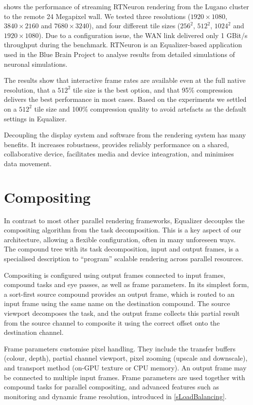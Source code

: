  shows the performance of streaming RTNeuron rendering from the
Lugano cluster to the remote 24 Megapixel wall. We tested three resolutions
($1920\times 1080$, $3840\times 2160$ and $7680\times 3240$), and four
different tile sizes ($256^2$, $512^2$, $1024^2$ and $1920\times 1080$). Due to
a configuration issue, the WAN link delivered only 1 GBit/s throughput during
the benchmark. RTNeuron is an Equalizer-based application used in the Blue
Brain Project to analyse results from detailed simulations of neuronal
simulations.

The results show that interactive frame rates are available even at the full
native resolution, that a $512^2$ tile size is the best option, and that 95\%
compression delivers the best performance in most cases. Based on the
experiments we settled on a $512^2$ tile size and 100\% compression quality to
avoid artefacts as the default settings in Equalizer.

Decoupling the display system and software from the rendering system has many
benefits. It increases robustness, provides reliably performance on a shared,
collaborative device, facilitates media and device inteagration, and minimises
data movement.

\section{Compositing}

In contrast to most other parallel rendering frameworks, Equalizer decouples the
compositing algorithm from the task decomposition. This is a key aspect of our
architecture, allowing a flexible configuration, often in many unforeseen
ways. The compound tree with its task decomposition, input and output frames, is
a specialised description to ``program''  scalable rendering across parallel
resources.

Compositing is configured using output frames connected to input frames,
compound tasks and eye passes, as well as frame parameters. In its simplest
form, a sort-first source compound provides an output frame, which is routed
to an input frame using the same name on the destination compound. The source
viewport decomposes the task, and the output frame collects this partial result
from the source channel to composite it using the correct offset onto the
destination channel.

Frame parameters customise pixel handling. They include the transfer buffers
(colour, depth), partial channel viewport, pixel zooming (upscale and
downscale), and transport method (on-GPU texture or CPU memory). An output
frame may be connected to multiple input frames. Frame parameters are used
together with compound tasks for parallel compositing, and advanced features
such as monitoring and dynamic frame resolution, introduced in
\cref{sLoadBalancing}.

